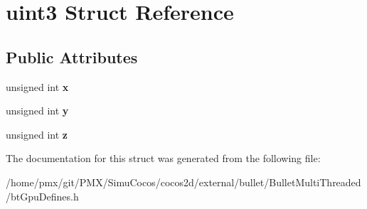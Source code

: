 \hypertarget{structuint3}{}\section{uint3 Struct Reference}
\label{structuint3}
\subsection*{Public Attributes}
\begin{DoxyCompactItemize}
\item 
\mbox{\label{structuint3_ae5e53a2c212b95e0425bc11c591bf5f3}} 
unsigned int {\bfseries x}
\item 
\mbox{\label{structuint3_a46416386666d0bfd98c6dff811353cca}} 
unsigned int {\bfseries y}
\item 
\mbox{\label{structuint3_a5c811d4e09ad664f1ee19cbe51da3b3e}} 
unsigned int {\bfseries z}
\end{DoxyCompactItemize}


The documentation for this struct was generated from the following file\+:\begin{DoxyCompactItemize}
\item 
/home/pmx/git/\+P\+M\+X/\+Simu\+Cocos/cocos2d/external/bullet/\+Bullet\+Multi\+Threaded/bt\+Gpu\+Defines.\+h\end{DoxyCompactItemize}
